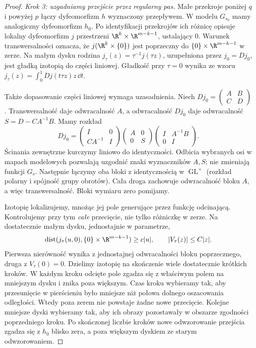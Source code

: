 \begin{proof}
\emph{Krok 3: uzgadniamy przejście przez regularny pas.}
Małe przekroje poniżej $q$ i powyżej $p$ łączy
dyfeomorfizm $h$ wyznaczony przepływem.
W modelu $G_{s_0}$ mamy analogiczny dyfeomorfizm $h_0$.
Po identyfikacji przekrojów ich różnicę opisuje lokalny
dyfeomorfizm $j$ przestrzeni $\R^k\times\R^{m-k-1}$,
ustalający $0$. Warunek transwersalności oznacza,
że $j(\R^k\times\{0\})$ jest poprzeczny do
$\{0\}\times\R^{m-k-1}$ w zerze.
Na małym dysku rodzina $j_\tau(z)=\tau^{-1}j(\tau z)$,
uzupełniona przez $j_0=Dj_0$, jest gładką izotopią
do części liniowej. Gładkość przy $\tau=0$ wynika ze wzoru
$j_\tau(z)=\int_0^1 Dj(t\tau z)z\,\dd t$.

Także dopasowanie części liniowej wymaga uzasadnienia.
Niech $Dj_0=\left(\begin{smallmatrix}A&B\\C&D\end{smallmatrix}\right)$.
Transwersalność daje odwracalność $A$, a odwracalność
$Dj_0$ daje odwracalność $S=D-CA^{-1}B$.
Mamy rozkład
\[
 Dj_0=
 \begin{pmatrix}I&0\\CA^{-1}&I\end{pmatrix}
 \begin{pmatrix}A&0\\0&S\end{pmatrix}
 \begin{pmatrix}I&A^{-1}B\\0&I\end{pmatrix}.
\]
Ścinania zewnętrzne kurczymy liniowo do identyczności.
Odbicia wybranych osi w mapach modelowych pozwalają
uzgodnić znaki wyznaczników $A,S$; nie zmieniają funkcji $G_s$.
Następnie łączymy oba bloki z identycznością w
$\operatorname{GL}^+$ (rozkład polarny i spójność grupy
obrotów). Cała droga zachowuje odwracalność bloku $A$,
a więc transwersalność. Bloki wymiaru zero pomijamy.

Izotopię lokalizujemy, mnożąc jej pole generujące
przez funkcję odcinającą. Kontrolujemy przy tym
\emph{całe} przecięcie, nie tylko różniczkę w zerze.
Na dostatecznie małym dysku, jednostajnie w parametrze,
\[
 \operatorname{dist}(j_\tau(u,0),\{0\}\times\R^{m-k-1})
       \geq c|u|,\qquad |V_\tau(z)|\leq C|z|.
\]
Pierwsza nierówność wynika z jednostajnej odwracalności
bloku poprzecznego, druga z $V_\tau(0)=0$.
Dzielimy izotopię na skończenie wiele dostatecznie
krótkich kroków. W każdym kroku odcięte pole zgadza się
z właściwym polem na mniejszym dysku i znika poza większym.
Czas kroku wybieramy tak, aby przesunięcie w pierścieniu
było mniejsze niż połowa dolnego oszacowania odległości.
Wtedy poza zerem nie powstaje żadne nowe przecięcie.
Kolejne mniejsze dyski wybieramy tak, aby ich obrazy
pozostawały w obszarze zgodności poprzedniego kroku.
Po skończonej liczbie kroków nowe odwzorowanie przejścia
zgadza się z $h_0$ blisko zera, a poza większym dyskiem
ze starym odwzorowaniem.


\end{proof}
